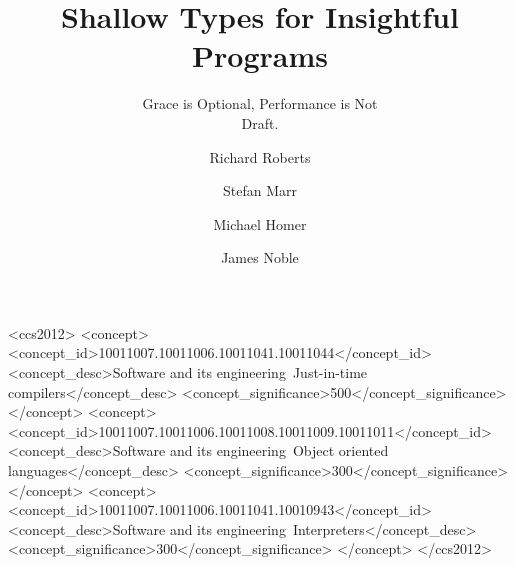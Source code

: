 \documentclass[sigplan, authordraft, 10pt]{acmart}
\begin{document}
\title{Shallow Types for Insightful Programs}
\subtitle{Grace is Optional, Performance is Not\\Draft.}

\author{Richard Roberts}


\author{Stefan Marr}

\author{Michael Homer}
\orcid{}

\author{James Noble}

\renewcommand{\shortauthors}{R. Roberts et al.}




%
%

\begin{CCSXML}
<ccs2012>
<concept>
<concept_id>10011007.10011006.10011041.10011044</concept_id>
<concept_desc>Software and its engineering~Just-in-time compilers</concept_desc>
<concept_significance>500</concept_significance>
</concept>
<concept>
<concept_id>10011007.10011006.10011008.10011009.10011011</concept_id>
<concept_desc>Software and its engineering~Object oriented languages</concept_desc>
<concept_significance>300</concept_significance>
</concept>
<concept>
<concept_id>10011007.10011006.10011041.10010943</concept_id>
<concept_desc>Software and its engineering~Interpreters</concept_desc>
<concept_significance>300</concept_significance>
</concept>
</ccs2012>
\end{CCSXML}
\end{document}
